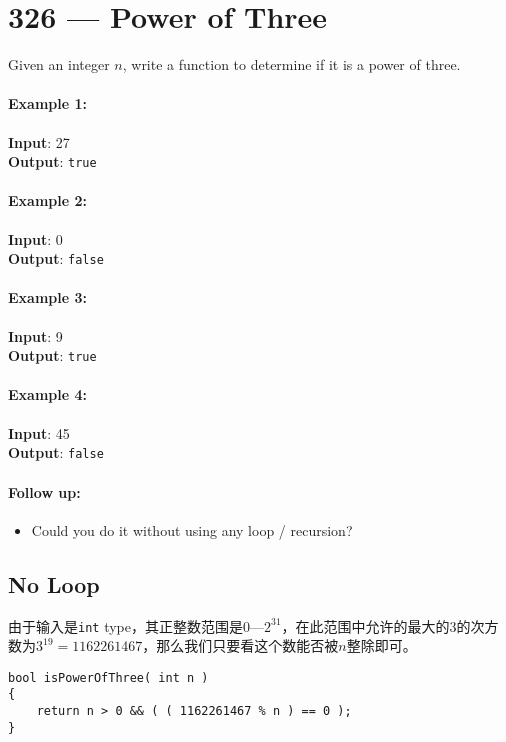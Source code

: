\section{326 --- Power of Three}
Given an integer $n$, write a function to determine if it is a power of three.

\paragraph{Example 1:}

\begin{flushleft}
\textbf{Input}: 27
\\
\textbf{Output}: \texttt{true}
\end{flushleft}

\paragraph{Example 2:}

\begin{flushleft}
\textbf{Input}: 0
\\
\textbf{Output}: \texttt{false}
\end{flushleft}

\paragraph{Example 3:}

\begin{flushleft}
\textbf{Input}: 9
\\
\textbf{Output}: \texttt{true}
\end{flushleft}

\paragraph{Example 4:}

\begin{flushleft}
\textbf{Input}: 45
\\
\textbf{Output}: \texttt{false}
\end{flushleft}

\paragraph{Follow up:}
\begin{itemize}
\item Could you do it without using any loop / recursion?
\end{itemize}

\subsection{No Loop}
由于输入是\texttt{int} type，其正整数范围是$0$---$2^{31}$，在此范围中允许的最大的3的次方数为$ 3^{19}=1162261467 $，那么我们只要看这个数能否被$ n $整除即可。
\setcounter{lstlisting}{0}
\begin{lstlisting}[style=customc, caption={No Loop}]
bool isPowerOfThree( int n )
{
    return n > 0 && ( ( 1162261467 % n ) == 0 );
}
\end{lstlisting}